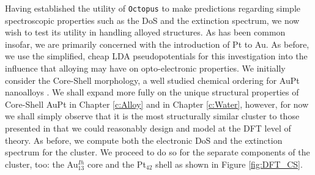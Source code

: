  Having established the utility of \texttt{Octopus} to make predictions regarding simple spectroscopic properties such as the DoS and the extinction spectrum, we now wish to test its utility in handling alloyed structures. As has been common insofar, we are primarily concerned with the introduction of Pt to Au. As before, we use the simplified, cheap LDA pseudopotentials for this investigation into the influence that alloying may have on opto-electronic properties. We initially consider the Core-Shell morphology, a well studied chemical ordering for AuPt nanoalloys \cite{nano9111644,5257275,https://doi.org/10.1002/ppsc.201700401,doi:10.1021/acsami.9b10158,Namsoon2021}. We shall expand more fully on the unique structural properties of Core-Shell AuPt in Chapter \ref{c:Alloy} and in Chapter \ref{c:Water}, however, for now we shall simply observe that it is the most structurally similar cluster to those presented in \cite{JorgeStructure,Jorge2019} that we could reasonably design and model at the DFT level of theory. As before, we compute both the electronic DoS and the extinction spectrum for the cluster. We proceed to do so for the separate components of the cluster, too: the Au$_{13}^{Ih}$ core and the Pt$_{42}$ shell as shown in Figure \ref{fig:DFT_CS}.

